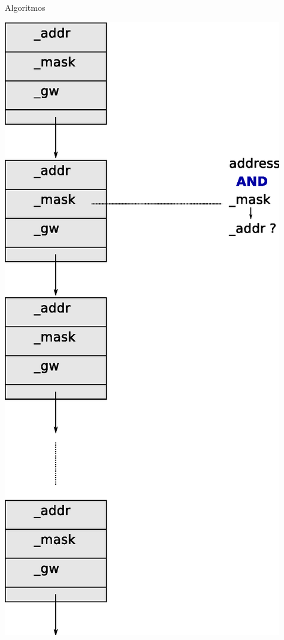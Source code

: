 \documentclass[xcolor=dvipsnames]{beamer}
\begin{document}
\begin{frame}{Algoritmos}

	\center	
	\includegraphics[scale=0.30]{figures/lluimp.eps}  

\end{frame}
\end{document}
